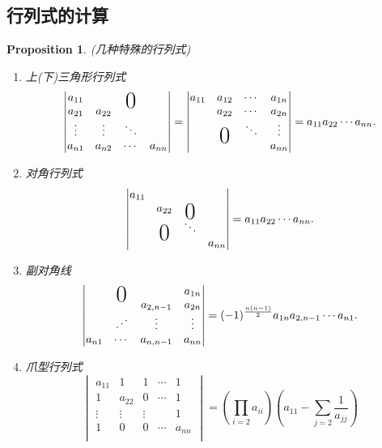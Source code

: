 \documentclass{article}
\newtheorem{proposition}[theorem]{Proposition}
\newcommand\bigzero{\makebox(0,0){\text{\huge0}}} %
\begin{document}
\subsection{行列式的计算}
\begin{proposition}
\rm {\color{red} (几种特殊的行列式)}
\begin{enumerate}
	\item {\color{red}上(下)三角形行列式}
	$$
	\begin{vmatrix}
	a_{11} & & \bigzero\\
	a_{21} & a_{22} \\
	\vdots & \vdots & \ddots \\
	a_{n1} & a_{n2} & \cdots & a_{nn}
	\end{vmatrix} =
	\begin{vmatrix}
	a_{11} & a_{12} & \cdots & a_{1n}\\
	&	a_{22} & \cdots & a_{2n} \\
	&\bigzero& \ddots & \vdots \\
	&&& a_{nn} \\
	\end{vmatrix} = a_{11}a_{22}\cdots a_{nn}.
	$$
	\item {\color{red}对角行列式}
	$$
	\begin{vmatrix}
	a_{11} &&& \\
	&a_{22} &\bigzero& \\
	&\bigzero&\ddots& \\
	&&&a_{nn}
	\end{vmatrix} = a_{11}a_{22}\cdots a_{nn}.
	$$
	\item {\color{red}副对角线}
	$$
	\begin{vmatrix}
	&\bigzero&& a_{1n} \\
	&&a_{2,n-1}& a_{2n} \\
	&\iddots&\vdots& \vdots \\
	a_{n1}&\cdots&a_{n,n-1}& a_{nn} \\
 	\end{vmatrix} = (-1)^{\frac{n(n-1)}{2}}a_{1n}a_{2,{n-1}}\cdots a_{n1}.
	$$
	\item {\color{red}爪型行列式}
	$$
	\begin{vmatrix}
	a_{11} & 1 & 1 & \cdots & 1 \\ 
	1 & a_{22} & 0 & \cdots & 1 \\
	\vdots & \vdots & \vdots &  & 1 \\
	1 & 0 & 0 & \cdots  & a_{nn} \\ 
	\end{vmatrix} = \left(\prod\limits_{i=2}a_{ii}\right)\left(a_{11}-\sum\limits_{j=2}\frac{1}{a_{jj}}\right)
	$$
\end{enumerate}
\end{proposition}
\end{document}
